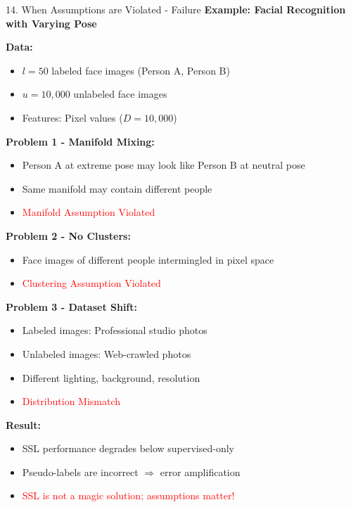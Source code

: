 \documentclass[8pt]{beamer}
\begin{document}
	\begin{frame}{14. When Assumptions are Violated - Failure}
		\fontsize{6.5}{7.5}\selectfont
		\textbf{Example: Facial Recognition with Varying Pose}
		
		\textbf{Data:}
		\begin{itemize}
			\item $l = 50$ labeled face images (Person A, Person B)
			\item $u = 10,000$ unlabeled face images
			\item Features: Pixel values ($D = 10,000$)
		\end{itemize}
		
		\textbf{Problem 1 - Manifold Mixing:}
		\begin{itemize}
			\item Person A at extreme pose may look like Person B at neutral pose
			\item Same manifold may contain different people
			\item \textcolor{red}{Manifold Assumption Violated}
		\end{itemize}
		
		\textbf{Problem 2 - No Clusters:}
		\begin{itemize}
			\item Face images of different people intermingled in pixel space
			\item \textcolor{red}{Clustering Assumption Violated}
		\end{itemize}
		
		\textbf{Problem 3 - Dataset Shift:}
		\begin{itemize}
			\item Labeled images: Professional studio photos
			\item Unlabeled images: Web-crawled photos
			\item Different lighting, background, resolution
			\item \textcolor{red}{Distribution Mismatch}
		\end{itemize}
		
		\textbf{Result:}
		\begin{itemize}
			\item SSL performance degrades below supervised-only
			\item Pseudo-labels are incorrect $\Rightarrow$ error amplification
			\item \textcolor{red}{SSL is not a magic solution; assumptions matter!}
		\end{itemize}
	\end{frame}
	
\end{document}
